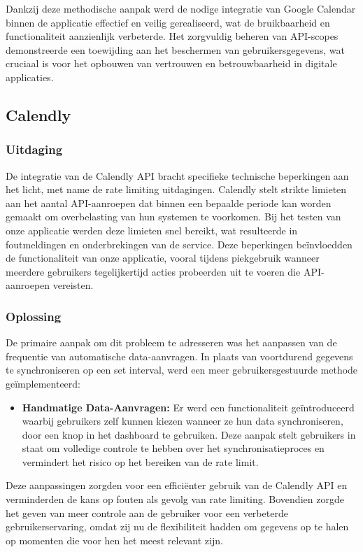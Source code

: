 Dankzij deze methodische aanpak werd de nodige integratie van Google Calendar binnen de applicatie effectief en veilig gerealiseerd, wat de bruikbaarheid en functionaliteit aanzienlijk verbeterde. Het zorgvuldig beheren van API-scopes demonstreerde een toewijding aan het beschermen van gebruikersgegevens, wat cruciaal is voor het opbouwen van vertrouwen en betrouwbaarheid in digitale applicaties.


\subsection{Calendly}

\subsubsection{Uitdaging}
De integratie van de Calendly API bracht specifieke technische beperkingen aan het licht, met name de rate limiting uitdagingen. Calendly stelt strikte limieten aan het aantal API-aanroepen dat binnen een bepaalde periode kan worden gemaakt om overbelasting van hun systemen te voorkomen. Bij het testen van onze applicatie werden deze limieten snel bereikt, wat resulteerde in foutmeldingen en onderbrekingen van de service. Deze beperkingen beïnvloedden de functionaliteit van onze applicatie, vooral tijdens piekgebruik wanneer meerdere gebruikers tegelijkertijd acties probeerden uit te voeren die API-aanroepen vereisten.

\subsubsection{Oplossing}
De primaire aanpak om dit probleem te adresseren was het aanpassen van de frequentie van automatische data-aanvragen. In plaats van voortdurend gegevens te synchroniseren op een set interval, werd een meer gebruikersgestuurde methode geïmplementeerd:
\begin{itemize}
    \item \textbf{Handmatige Data-Aanvragen:} Er werd een functionaliteit geïntroduceerd waarbij gebruikers zelf kunnen kiezen wanneer ze hun data synchroniseren, door een knop in het dashboard te gebruiken. Deze aanpak stelt gebruikers in staat om volledige controle te hebben over het synchronisatieproces en vermindert het risico op het bereiken van de rate limit.
\end{itemize}

Deze aanpassingen zorgden voor een efficiënter gebruik van de Calendly API en verminderden de kans op fouten als gevolg van rate limiting. Bovendien zorgde het geven van meer controle aan de gebruiker voor een verbeterde gebruikerservaring, omdat zij nu de flexibiliteit hadden om gegevens op te halen op momenten die voor hen het meest relevant zijn.


